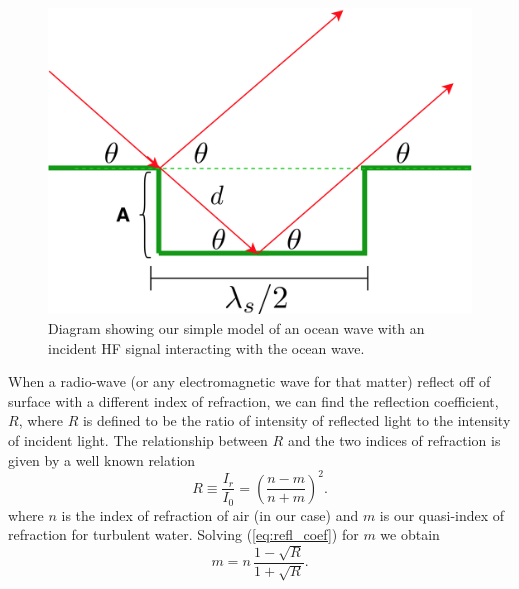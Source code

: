 \documentclass[11pt]{article}
\numberwithin{equation}{section}
\begin{document}
\begin{figure}[ht]
 \begin{center}
     \includegraphics[width = 3.in]{figs/ocean.png}
 \end{center}
 \caption{Diagram showing our simple model of an ocean wave with an incident HF signal interacting with the ocean wave.}
 \label{fig:ocean}
\end{figure}

When a radio-wave (or any electromagnetic wave for that matter) reflect off of surface with a different index of refraction, we can find the reflection coefficient, $R$, where $R$ is defined to be the ratio of intensity of reflected light to the intensity of incident light. The relationship between $R$ and the two indices of refraction is given by a well known relation\cite{jackson1999classical,griffiths2005introduction}
\begin{equation}
    R \equiv \frac{I_r}{I_0} = \left(\frac{n-m}{n+m}\right)^2.
    \label{eq:refl_coef}
\end{equation}
where $n$ is the index of refraction of air (in our case) and $m$ is our quasi-index of refraction for turbulent water. Solving (\ref{eq:refl_coef}) for $m$ we obtain
\begin{equation}
    m = n \, \frac{1 - \sqrt R}{1+\sqrt{R}}.
    \label{eq:quasi_index}
\end{equation}
\end{document}

